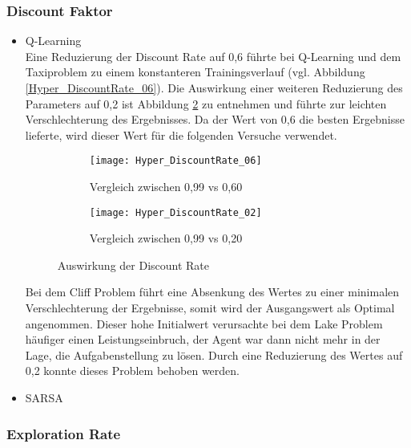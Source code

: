 \subsubsection{Discount Faktor}
\begin{itemize}
    \item Q-Learning\\
    Eine Reduzierung der Discount Rate auf 0,6 führte bei Q-Learning und dem Taxiproblem zu einem konstanteren Trainingsverlauf (vgl. Abbildung \ref{Hyper_DiscountRate_06}).
    Die Auswirkung einer weiteren Reduzierung des Parameters auf 0,2 ist Abbildung \ref{fig:DiscountRate02} zu entnehmen und führte zur leichten Verschlechterung des Ergebnisses.
    Da der Wert von 0,6 die besten Ergebnisse lieferte, wird dieser Wert für die folgenden Versuche verwendet.
    \begin{figure}[H]
        \centering
        \begin{subfigure}{.5\textwidth}
          \centering
          \texttt{[image: Hyper\_DiscountRate\_06]}
          \caption{Vergleich zwischen 0,99 vs 0,60}
          \label{fig:DiscountRate06}
        \end{subfigure}%
        \begin{subfigure}{.5\textwidth}
          \centering
          \texttt{[image: Hyper\_DiscountRate\_02]}
          \caption{Vergleich zwischen 0,99 vs 0,20}
          \label{fig:DiscountRate02}
        \end{subfigure}
        \caption{Auswirkung der Discount Rate}
        \label{fig:DiscountRate_Q-Learning}
    \end{figure}
    Bei dem Cliff Problem führt eine Absenkung des Wertes zu einer minimalen Verschlechterung der Ergebnisse, somit wird der Ausgangswert als Optimal angenommen. 
    Dieser hohe Initialwert verursachte bei dem Lake Problem häufiger einen Leistungseinbruch, der Agent war dann nicht mehr in der Lage, die Aufgabenstellung zu lösen.
    Durch eine Reduzierung des Wertes auf 0,2 konnte dieses Problem behoben werden.
    \item SARSA\\
\end{itemize}
\subsubsection{Exploration Rate}

